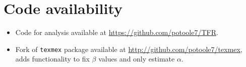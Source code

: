 \documentclass{article}
\numberwithin{equation}{section}
\begin{document}
\section{Code availability}

\begin{itemize}
  \item Code for analysis available at \url{https://github.com/potoole7/TFR}. 
  \item Fork of \texttt{texmex} package available at \url{http://github.com/potoole7/texmex}, adds functionality to fix $\beta$ values and only estimate $\alpha$. 
\end{itemize}

\newpage

\end{document}
